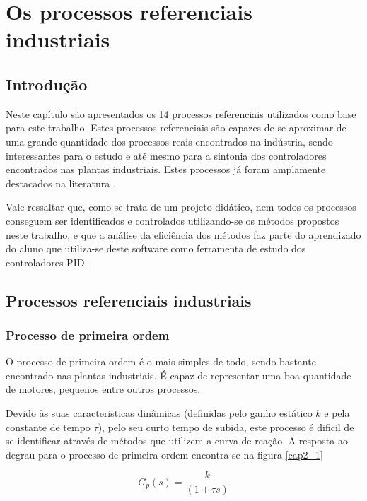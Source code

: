 \chapter{Os processos referenciais industriais
    \label{cap:processos-referenciais}}

\section{Introdução}

Neste capítulo são apresentados os 14 processos referenciais utilizados
como base para este trabalho. Estes processos referenciais são capazes de se
aproximar de uma grande quantidade dos processos reais encontrados na indústria,
sendo interessantes para o estudo e até mesmo para a sintonia dos controladores
encontrados nas plantas industriais. Estes processos já foram amplamente destacados
na literatura \cite{Isermann:1981:DCS:539455} \cite{ast+hagg100}.

Vale ressaltar que, como se trata de um projeto didático, nem todos os processos
conseguem ser identificados e controlados utilizando-se os métodos propostos
neste trabalho, e que a análise da eficiência dos métodos faz parte do aprendizado
do aluno que utiliza-se deste software como ferramenta de estudo dos controladores
\acs{PID}.

\section{Processos referenciais industriais}

\subsection{Processo de primeira ordem}
    
    O processo de primeira ordem é o mais simples de todo, sendo bastante encontrado
    nas plantas industriais. É capaz de representar uma boa quantidade de motores,
    pequenos entre outros processos.
    
    Devido às suas caracteristicas dinâmicas (definidas pelo ganho estático $k$ e
    pela constante de tempo $\tau$), pelo seu curto tempo de subida, este processo
    é dificil de se identificar através de métodos que utilizem a curva de reação.
    A resposta ao degrau para o processo de primeira ordem encontra-se na figura
    \ref{cap2_1}
    
    \begin{equation}
        G_p(s) = \frac{k}{(1+\tau s)}
    \end{equation}
    
